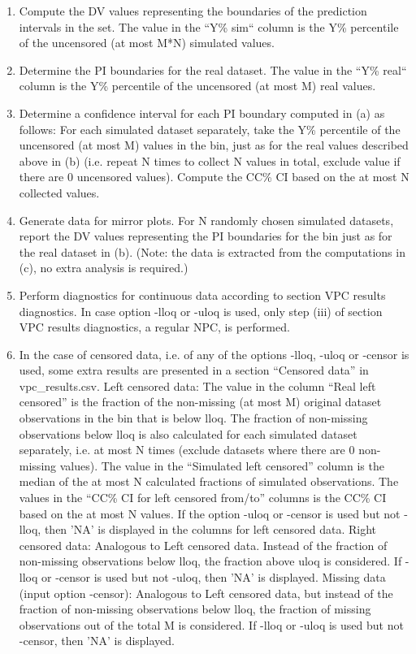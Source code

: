 \begin{enumerate}
	\item Compute the DV values representing the boundaries of the prediction intervals in the set. The value in the “Y\% sim“ column is the Y\% percentile of the uncensored (at most M*N) simulated values.

	\item Determine the PI boundaries for the real dataset. The value in the “Y\% real“ column is the Y\% percentile of the uncensored (at most M) real values.

	\item Determine a confidence interval for each PI boundary computed in (a) as follows: 
For each simulated dataset separately, take the Y\% percentile of the uncensored (at most M) values in the bin, just as for the real values described above in (b) (i.e. repeat N times to collect N values in total, exclude value if there are 0 uncensored values). Compute the CC\% CI based on the at most N collected values.

	\item Generate data for mirror plots. For N randomly chosen simulated datasets, report the DV values representing the PI boundaries for the bin just as for the real dataset in (b). (Note: the data is extracted from the computations in (c), no extra analysis is required.)

	\item Perform diagnostics for continuous data according to section VPC results diagnostics. In case option -lloq or -uloq is used, only step (iii) of section VPC results diagnostics, a regular NPC, is performed.  

	\item In the case of censored data, i.e. of any of the options -lloq, -uloq or -censor is used, some extra results are presented in a section “Censored data” in vpc\_results.csv. 
Left censored data: The value in the column “Real left censored” is the fraction of the non-missing (at most M) original dataset observations in the bin that is below lloq. The fraction of non-missing observations below lloq is also calculated for each simulated dataset separately, i.e. at most N times (exclude datasets where there are 0 non-missing values). The value in the “Simulated left censored” column is the median of the at most N calculated fractions of simulated observations. The values in the “CC\% CI for left censored from/to” columns is the CC\% CI based on the at most N values. If the option -uloq or -censor is used but not -lloq, then 'NA' is displayed in the columns for left censored data.
Right censored data: Analogous to Left censored data. Instead of the fraction of non-missing observations below lloq, the fraction above uloq is considered. If -lloq or -censor is used but not -uloq, then 'NA' is displayed.
Missing data (input option -censor): Analogous to Left censored data, but instead of the fraction of non-missing observations below lloq, the fraction of missing observations out of the total M is considered. If -lloq or -uloq is used but not -censor, then 'NA' is displayed.


\end{enumerate}
